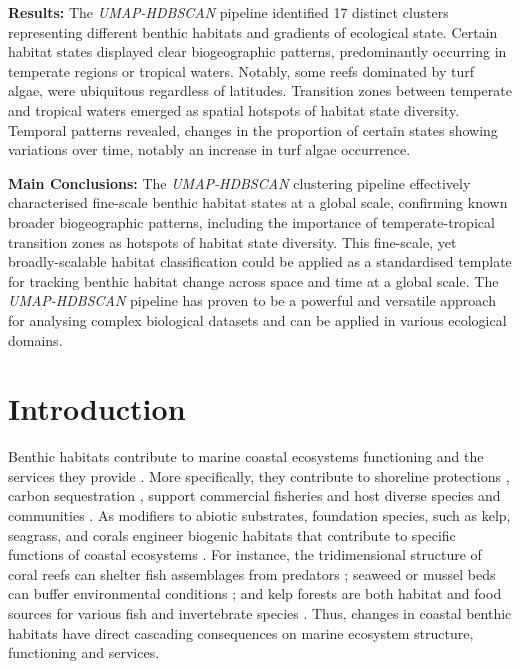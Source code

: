 \begin{refsection}
\textbf{Results:} The \emph{UMAP-HDBSCAN} pipeline identified 17
distinct clusters representing different benthic habitats and gradients
of ecological state. Certain habitat states displayed clear
biogeographic patterns, predominantly occurring in temperate regions or
tropical waters. Notably, some reefs dominated by turf algae, were
ubiquitous regardless of latitudes. Transition zones between temperate
and tropical waters emerged as spatial hotspots of habitat state
diversity. Temporal patterns revealed, changes in the proportion of
certain states showing variations over time, notably an increase in turf
algae occurrence.

\textbf{Main Conclusions:} The \emph{UMAP-HDBSCAN} clustering pipeline
effectively characterised fine-scale benthic habitat states at a global
scale, confirming known broader biogeographic patterns, including the
importance of temperate-tropical transition zones as hotspots of habitat
state diversity. This fine-scale, yet broadly-scalable habitat
classification could be applied as a standardised template for tracking
benthic habitat change across space and time at a global scale. The
\emph{UMAP-HDBSCAN} pipeline has proven to be a powerful and versatile
approach for analysing complex biological datasets and can be applied in
various ecological domains.

\clearpage

\hypertarget{intro-chapt2}{%
\section{Introduction}\label{intro-chapt2}}

Benthic habitats contribute to marine coastal ecosystems functioning and
the services they provide \autocite{Barbier_2011}. More specifically,
they contribute to shoreline protections \autocite{Barbier_2017}, carbon
sequestration \autocite{Fourqurean_2012}, support commercial fisheries
\autocite{Barbier_2017} and host diverse species and communities
\autocite{Sunday_2017}. As modifiers to abiotic substrates, foundation
species, such as kelp, seagrass, and corals engineer biogenic habitats
that contribute to specific functions of coastal ecosystems
\autocite{Elith_2009}. For instance, the tridimensional structure of
coral reefs can shelter fish assemblages from predators
\autocite{Hixon_1993}; seaweed or mussel beds can buffer environmental
conditions \autocites[ ]{Jurgens_2022}{Whitaker_2023}; and kelp forests
are both habitat and food sources for various fish and invertebrate
species \autocite{Edgar_2004}. Thus, changes in coastal benthic habitats
have direct cascading consequences on marine ecosystem structure,
functioning and services.


\end{refsection}
